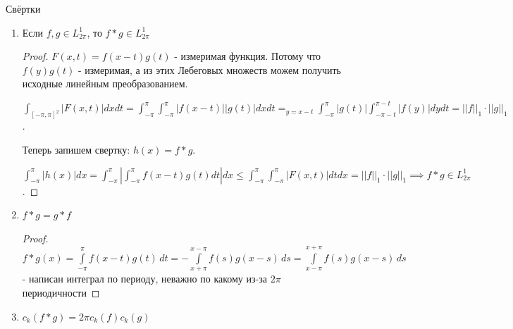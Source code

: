 \begin{properties}
    Свёртки
    \begin{enumerate}
        \item {
            Если $f, g \in L_{2\pi}^1$, то $f * g \in L_{2\pi}^1$

            \begin{proof}
                $F(x, t) = f(x - t)g(t)$ - измеримая функция. Потому что $f(y)g(t)$ - измеримая, а из этих Лебеговых множеств можем получить исходные линейным преобразованием.

                $\int_{[-\pi, \pi]^2} |F(x, t)| dx dt = \int_{-\pi}^{\pi} \int_{-\pi}^{\pi} | f(x - t) | |g(t)| dx dt =_{y = x - t} \int_{-\pi}^{\pi} |g(t)| \int_{-\pi - t}^{\pi - t} |f(y)| dy dt = ||f||_1 \cdot ||g||_1$.

                Теперь запишем свертку: $h(x) = f*g$.

                $\int_{-\pi}^{\pi} |h(x)| dx = \int_{-\pi}^{\pi} \left| \int_{-\pi}^{\pi} f(x-t) g(t) dt \right| dx \leq \int_{-\pi}^{\pi} \int_{-\pi}^{\pi} |F(x, t)| dt dx = ||f||_1 \cdot ||g||_1 \implies f * g \in L_{2\pi}^1$.

            \end{proof}
        } 
        \item {
            $f * g = g * f$

            \begin{proof}
                $f * g (x) = \int\limits_{-\pi}^\pi f(x - t)g(t) \, dt = -\int\limits_{x+\pi}^{x-\pi} f(s) g(x - s) \, ds = \int\limits_{x-\pi}^{x+\pi} f(s) g(x - s) \, ds$ - написан интеграл по периоду, неважно по какому из-за $2\pi$ периодичности
            \end{proof}
        }
        \item {
            $c_k (f * g) = 2\pi c_k (f) c_k (g)$

}
\end{enumerate}
\end{properties}
